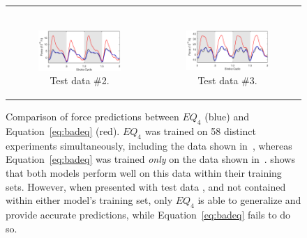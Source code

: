 \documentclass{article}
\begin{document}
\begin{figure}[ht]
\begin{tabular}{cc}
\begin{subfigure}{0.48\textwidth}
\end{subfigure} \\
\begin{subfigure}{0.48\textwidth}
\centering
\includegraphics[width=\textwidth]{figures/eq_goodbad_3}
\caption{\label{fig:eq_goodbad_3} Test data \#2.}
\end{subfigure} &
\begin{subfigure}{0.48\textwidth}
\centering
\includegraphics[width=\textwidth]{figures/eq_goodbad_4}
\caption{\label{fig:eq_goodbad_4} Test data \#3.}
\end{subfigure}
\end{tabular}
\caption{Comparison of force predictions between $EQ_4$ (blue) and
Equation~\eqref{eq:badeq} (red). $EQ_4$ was trained on 58 distinct experiments
simultaneously, including the data shown in~, whereas
Equation~\eqref{eq:badeq} was trained \emph{only} on the data shown
in~.   shows that both models
perform well on this data within their training sets.  However, when presented
with test data ,  and
 not contained within either model's training set, only $EQ_4$ is able to
generalize and provide accurate predictions, while Equation~\eqref{eq:badeq}
fails to do so.}
\label{fig:eq_goodbad}
\end{figure}
\end{document}
